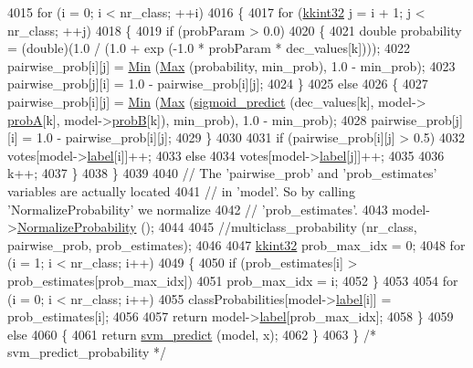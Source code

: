 \begin{DoxyCode}
4015     \textcolor{keywordflow}{for} (i = 0;  i < nr\_class;  ++i)
4016     \{
4017       \textcolor{keywordflow}{for} (\hyperlink{namespace_k_k_b_a8fa4952cc84fda1de4bec1fbdd8d5b1b}{kkint32} j = i + 1;  j < nr\_class;  ++j)
4018       \{
4019         \textcolor{keywordflow}{if}  (probParam > 0.0)
4020         \{
4021           \textcolor{keywordtype}{double} probability = (double)(1.0 / (1.0 + exp (-1.0 * probParam * dec\_values[k])));
4022           pairwise\_prob[i][j] = \hyperlink{_raster_8cpp_a6261a282d8ed27242c636ad5fb658585}{Min} (\hyperlink{namespace_k_k_b_a25e187e24c091586293725f27f007ad7}{Max} (probability, min\_prob), 1.0 - min\_prob);
4023           pairwise\_prob[j][i] = 1.0 - pairwise\_prob[i][j];
4024         \}
4025         \textcolor{keywordflow}{else}
4026         \{
4027           pairwise\_prob[i][j] = \hyperlink{_raster_8cpp_a6261a282d8ed27242c636ad5fb658585}{Min} (\hyperlink{namespace_k_k_b_a25e187e24c091586293725f27f007ad7}{Max} (\hyperlink{namespace_s_v_m289___m_f_s_ae9ae68befb58132b942d39cd83817bc8}{sigmoid\_predict} (dec\_values[k], model->
      \hyperlink{struct_s_v_m289___m_f_s_1_1_svm___model_ae32212566d46d6d9cafbddd37dcfbada}{probA}[k], model->\hyperlink{struct_s_v_m289___m_f_s_1_1_svm___model_a4849dabb9dde1adde990980c6c7e1737}{probB}[k]), min\_prob), 1.0 - min\_prob);
4028           pairwise\_prob[j][i] = 1.0 - pairwise\_prob[i][j];
4029         \}
4030 
4031         \textcolor{keywordflow}{if}  (pairwise\_prob[i][j] > 0.5)
4032           votes[model->\hyperlink{struct_s_v_m289___m_f_s_1_1_svm___model_a2f46b2e4f808a25c5f4d15e65c988872}{label}[i]]++;
4033         \textcolor{keywordflow}{else}
4034           votes[model->\hyperlink{struct_s_v_m289___m_f_s_1_1_svm___model_a2f46b2e4f808a25c5f4d15e65c988872}{label}[j]]++;
4035 
4036         k++;
4037       \}
4038     \}
4039 
4040     \textcolor{comment}{// The 'pairwise\_prob' and 'prob\_estimates' variables are actually located}
4041     \textcolor{comment}{// in 'model'.  So by calling 'NormalizeProbability'  we normalize }
4042     \textcolor{comment}{// 'prob\_estimates'.}
4043     model->\hyperlink{struct_s_v_m289___m_f_s_1_1_svm___model_a130c243047236acbfbe4005416de39a1}{NormalizeProbability} (); 
4044 
4045     \textcolor{comment}{//multiclass\_probability (nr\_class, pairwise\_prob, prob\_estimates);}
4046 
4047     \hyperlink{namespace_k_k_b_a8fa4952cc84fda1de4bec1fbdd8d5b1b}{kkint32} prob\_max\_idx = 0;
4048     \textcolor{keywordflow}{for} (i = 1;  i < nr\_class;  i++)
4049     \{
4050       \textcolor{keywordflow}{if}  (prob\_estimates[i] > prob\_estimates[prob\_max\_idx])
4051         prob\_max\_idx = i;
4052     \}
4053 
4054     \textcolor{keywordflow}{for} (i = 0;  i < nr\_class;  i++)
4055       classProbabilities[model->\hyperlink{struct_s_v_m289___m_f_s_1_1_svm___model_a2f46b2e4f808a25c5f4d15e65c988872}{label}[i]] = prob\_estimates[i];
4056 
4057     \textcolor{keywordflow}{return}  model->\hyperlink{struct_s_v_m289___m_f_s_1_1_svm___model_a2f46b2e4f808a25c5f4d15e65c988872}{label}[prob\_max\_idx];
4058   \}
4059   \textcolor{keywordflow}{else} 
4060   \{
4061     \textcolor{keywordflow}{return}  \hyperlink{namespace_s_v_m233_a7f194ec68b77ae5069b5a601d3870371}{svm\_predict} (model, x);
4062   \}
4063 \}  \textcolor{comment}{/* svm\_predict\_probability */}
\end{DoxyCode}
